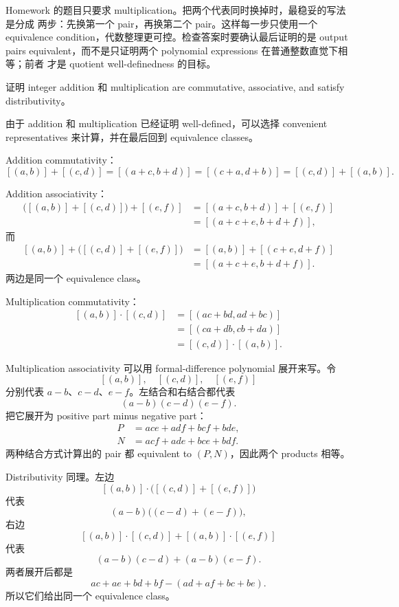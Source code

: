 \begin{explanation}
Homework 的题目只要求 multiplication。把两个代表同时换掉时，最稳妥的写法是分成
两步：先换第一个 pair，再换第二个 pair。这样每一步只使用一个 equivalence
condition，代数整理更可控。检查答案时要确认最后证明的是 output pairs
equivalent，而不是只证明两个 polynomial expressions 在普通整数直觉下相等；前者
才是 quotient well-definedness 的目标。
\end{explanation}

\begin{exerciseblock}
证明 integer addition 和 multiplication are commutative, associative, and satisfy
distributivity。
\end{exerciseblock}

\begin{solution}
由于 addition 和 multiplication 已经证明 well-defined，可以选择 convenient
representatives 来计算，并在最后回到 equivalence classes。

Addition commutativity：
\[
[(a,b)]+[(c,d)]
=[(a+c,b+d)]
=[(c+a,d+b)]
=[(c,d)]+[(a,b)].
\]

Addition associativity：
\[
\begin{aligned}
\bigl([(a,b)]+[(c,d)]\bigr)+[(e,f)]
  &=[(a+c,b+d)]+[(e,f)]\\
  &=[(a+c+e,b+d+f)],
\end{aligned}
\]
而
\[
\begin{aligned}
[(a,b)]+\bigl([(c,d)]+[(e,f)]\bigr)
  &=[(a,b)]+[(c+e,d+f)]\\
  &=[(a+c+e,b+d+f)].
\end{aligned}
\]
两边是同一个 equivalence class。

Multiplication commutativity：
\[
\begin{aligned}
[(a,b)]\cdot[(c,d)]
  &=[(ac+bd,ad+bc)]\\
  &=[(ca+db,cb+da)]\\
  &=[(c,d)]\cdot[(a,b)].
\end{aligned}
\]

Multiplication associativity 可以用 formal-difference polynomial 展开来写。令
\[
[(a,b)],\quad [(c,d)],\quad [(e,f)]
\]
分别代表 \(a-b\)、\(c-d\)、\(e-f\)。左结合和右结合都代表
\[
  (a-b)(c-d)(e-f).
\]
把它展开为 positive part minus negative part：
\[
\begin{aligned}
P&=ace+adf+bcf+bde,\\
N&=acf+ade+bce+bdf.
\end{aligned}
\]
两种结合方式计算出的 pair 都 equivalent to \((P,N)\)，因此两个 products 相等。

Distributivity 同理。左边
\[
[(a,b)]\cdot\bigl([(c,d)]+[(e,f)]\bigr)
\]
代表
\[
  (a-b)\bigl((c-d)+(e-f)\bigr),
\]
右边
\[
[(a,b)]\cdot[(c,d)]+[(a,b)]\cdot[(e,f)]
\]
代表
\[
  (a-b)(c-d)+(a-b)(e-f).
\]
两者展开后都是
\[
  ac+ae+bd+bf-(ad+af+bc+be).
\]
所以它们给出同一个 equivalence class。
\end{solution}

